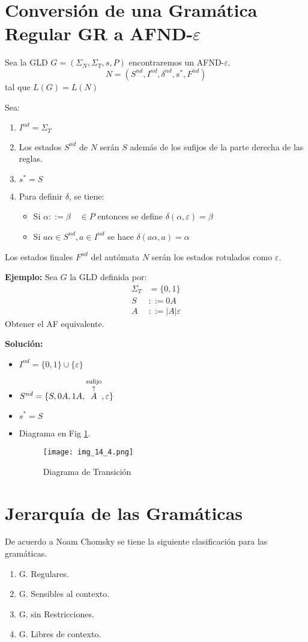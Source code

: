 \section{Conversión de una Gramática Regular GR a AFND-$\varepsilon$}
Sea la GLD $G=(\Sigma_N,\Sigma_T,s,P)$ encontraremos un AFND-$\varepsilon$.
$$N=(S^{nd},I^{nd},\delta^{nd},s^*,F^{nd})$$
tal que $L(G)=L(N)$

Sea:
\begin{enumerate}
\item $I^{nd}=\Sigma_T$
\item Los estados $S^{nd}$ de $N$ serán $S$ además de los sufijos de la parte derecha de las reglas.
\item $s^*=S$
\item Para definir $\delta$, se tiene:
	\begin{itemize}
	\item Si $\alpha::=\beta\quad\in P$ entonces se define $\delta(\alpha,\varepsilon)=\beta$
	\item Si $a\alpha\in S^{nd},a\in I^{nd}$ se hace $\delta(a\alpha,a)=\alpha$
	\end{itemize}
\end{enumerate}
Los estados finales $F^{nd}$ del autómata $N$ serán los estados rotulados como $\varepsilon$.

\textbf{Ejemplo: }Sea $G$ la GLD definida por:
\begin{align*}
\Sigma_T&=\{0,1\}	\\
S&::=0A	\\
A&::=|A|\varepsilon
\end{align*}
Obtener el AF equivalente.

\textbf{Solución: }
\begin{itemize}
\item $I^{nd}=\{0,1\}\cup\{\varepsilon\}$
\item $S^{nd}=\{S,0A,1A,\uplegend{A}{sufijo},\varepsilon\}$
\item $s^*=S$
\item Diagrama en Fig \ref{img_14_4}.
\begin{figure}[h!]
\centering
\texttt{[image: img\_14\_4.png]}
\caption{Diagrama de Transición}\label{img_14_4}
\end{figure}

\end{itemize}
\section{Jerarquía de las Gramáticas}
De acuerdo a Noam Chomsky se tiene la siguiente clasificación para las gramáticas.
\begin{enumerate}
\item G. Regulares.
\item G. Sensibles al contexto.
\item G. sin Restricciones.
\item G. Libres de contexto.
\end{enumerate}
